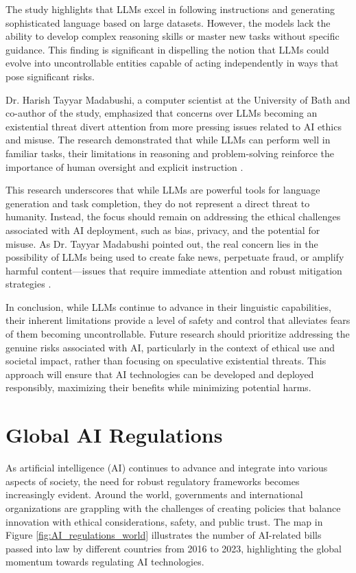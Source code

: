 The study highlights that LLMs excel in following instructions and generating sophisticated language based on large datasets. However, the models lack the ability to develop complex reasoning skills or master new tasks without specific guidance. This finding is significant in dispelling the notion that LLMs could evolve into uncontrollable entities capable of acting independently in ways that pose significant risks.

Dr. Harish Tayyar Madabushi, a computer scientist at the University of Bath and co-author of the study, emphasized that concerns over LLMs becoming an existential threat divert attention from more pressing issues related to AI ethics and misuse. The research demonstrated that while LLMs can perform well in familiar tasks, their limitations in reasoning and problem-solving reinforce the importance of human oversight and explicit instruction \cite{bath2024ai}.

This research underscores that while LLMs are powerful tools for language generation and task completion, they do not represent a direct threat to humanity. Instead, the focus should remain on addressing the ethical challenges associated with AI deployment, such as bias, privacy, and the potential for misuse. As Dr. Tayyar Madabushi pointed out, the real concern lies in the possibility of LLMs being used to create fake news, perpetuate fraud, or amplify harmful content—issues that require immediate attention and robust mitigation strategies \cite{lu2023emergent}.

In conclusion, while LLMs continue to advance in their linguistic capabilities, their inherent limitations provide a level of safety and control that alleviates fears of them becoming uncontrollable. Future research should prioritize addressing the genuine risks associated with AI, particularly in the context of ethical use and societal impact, rather than focusing on speculative existential threats. This approach will ensure that AI technologies can be developed and deployed responsibly, maximizing their benefits while minimizing potential harms.

\section{Global AI Regulations}

As artificial intelligence (AI) continues to advance and integrate into various aspects of society, the need for robust regulatory frameworks becomes increasingly evident. Around the world, governments and international organizations are grappling with the challenges of creating policies that balance innovation with ethical considerations, safety, and public trust. The map in Figure \ref{fig:AI_regulations_world} illustrates the number of AI-related bills passed into law by different countries from 2016 to 2023, highlighting the global momentum towards regulating AI technologies.


